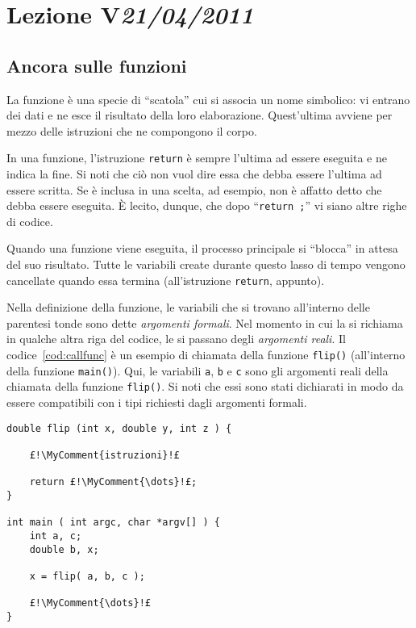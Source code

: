 \chapter[Lezione V]{Lezione V\newline\small{\emph{21/04/2011}}}
	\section{Ancora sulle funzioni}
	\label{sec:fun2}
La funzione è una specie di ``scatola'' cui si associa un nome simbolico: vi entrano dei dati e ne esce il risultato della loro elaborazione.
Quest'ultima avviene per mezzo delle istruzioni che ne compongono il corpo.

In  una funzione, l'istruzione \lstinline!return! è sempre l'ultima ad essere eseguita e ne indica la fine.
Si noti che ciò non vuol dire essa che debba essere l'ultima ad essere scritta.
Se è inclusa in una scelta, ad esempio, non è affatto detto che debba essere eseguita.
\`E lecito, dunque, che dopo ``\lstinline$return $\MyComment{\dots}\lstinline$;$'' vi siano altre righe di codice.

Quando una funzione viene eseguita, il processo principale si ``blocca'' in attesa del suo risultato.
Tutte le variabili create durante questo lasso di tempo vengono cancellate quando essa termina (all'istruzione \lstinline!return!, appunto). 

Nella definizione della funzione, le variabili che si trovano all'interno delle parentesi tonde sono dette \emph{argomenti formali}.
Nel momento in cui la si richiama in qualche altra riga del codice, le si passano degli \emph{argomenti reali}.
Il codice~\ref{cod:callfunc} è un esempio di chiamata della funzione \lstinline!flip()! (all'interno della funzione \lstinline!main()!).
Qui, le variabili \lstinline!a!, \lstinline!b! e \lstinline!c! sono gli argomenti reali della chiamata della funzione \lstinline!flip()!.
Si noti che essi sono stati dichiarati in modo da essere compatibili con i tipi richiesti dagli argomenti formali.
\begin{lstlisting}[caption={\em Chiamata della funzione \lstinline!flip()!.}, label={cod:callfunc}]
double flip (int x, double y, int z ) {

	£!\MyComment{istruzioni}!£

	return £!\MyComment{\dots}!£;
}

int main ( int argc, char *argv[] ) {
	int a, c;
	double b, x;

	x = flip( a, b, c );

	£!\MyComment{\dots}!£
}
\end{lstlisting}


